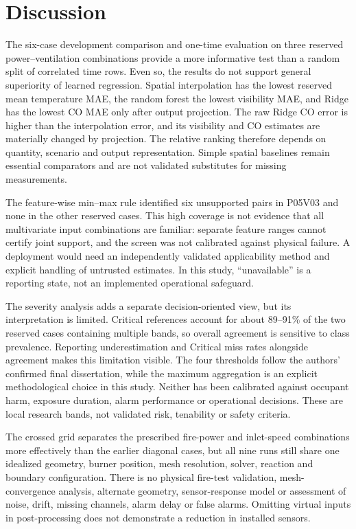\documentclass[preprint,12pt,authoryear]{elsarticle}
\begin{document}
\section{Discussion}
The six-case development comparison and one-time evaluation on three
reserved power--ventilation combinations provide a more informative test
than a random split of correlated time rows. Even so, the results do not
support general superiority of learned regression. Spatial interpolation
has the lowest reserved mean temperature MAE, the random forest the lowest
visibility MAE, and Ridge has the lowest CO MAE only after output
projection. The raw Ridge CO error is higher than the interpolation error,
and its visibility and CO estimates are materially changed by projection.
The relative ranking therefore depends on quantity, scenario and output
representation. Simple spatial baselines remain essential comparators and
are not validated substitutes for missing measurements.

The feature-wise min--max rule identified six unsupported pairs in P05V03
and none in the other reserved cases. This high coverage is not evidence
that all multivariate input combinations are familiar: separate feature
ranges cannot certify joint support, and the screen was not calibrated
against physical failure. A deployment would need an independently
validated applicability method and explicit handling of untrusted
estimates. In this study, ``unavailable'' is a reporting state, not an
implemented operational safeguard.

The severity analysis adds a separate decision-oriented view, but its
interpretation is limited. Critical references account for about 89--91\%
of the two reserved cases containing multiple bands, so overall agreement
is sensitive to class prevalence. Reporting underestimation and Critical
miss rates alongside agreement makes this limitation visible. The four
thresholds follow the authors' confirmed final dissertation, while the
maximum aggregation is an explicit methodological choice in this study.
Neither has been calibrated against occupant harm, exposure duration,
alarm performance or operational decisions. These are local research
bands, not validated risk, tenability or safety criteria.

The crossed grid separates the prescribed fire-power and inlet-speed
combinations more effectively than the earlier diagonal cases, but all
nine runs still share one idealized geometry, burner position, mesh
resolution, solver, reaction and boundary configuration. There is no
physical fire-test validation, mesh-convergence analysis, alternate
geometry, sensor-response model or assessment of noise, drift, missing
channels, alarm delay or false alarms. Omitting virtual inputs in
post-processing does not demonstrate a reduction in installed sensors.
\end{document}
